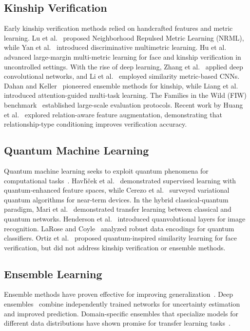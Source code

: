 \documentclass[journal,12pt]{IEEEtran}
\begin{document}
\subsection{Kinship Verification}
Early kinship verification methods relied on handcrafted features and
metric learning. Lu et al.~\cite{lu2014kinship} proposed Neighborhood
Repulsed Metric Learning (NRML), while Yan et al.~\cite{yan2014discriminative}
introduced discriminative multimetric learning. Hu et al.~\cite{hu2014large}
advanced large-margin multi-metric learning for face and kinship verification
in uncontrolled settings. With the rise of deep learning,
Zhang et al.~\cite{zhang2017kinship} applied deep convolutional networks,
and Li et al.~\cite{li2019kinship} employed similarity metric-based CNNs.
Dahan and Keller~\cite{dahan2017kin} pioneered ensemble methods for
kinship, while Liang et al.~\cite{liang2021attention} introduced
attention-guided multi-task learning. The Families in the Wild (FIW)
benchmark~\cite{robinson2018visual} established large-scale evaluation
protocols. Recent work by Huang et al.~\cite{huang2021relation} explored
relation-aware feature augmentation, demonstrating that relationship-type
conditioning improves verification accuracy.

\subsection{Quantum Machine Learning}
Quantum machine learning seeks to exploit quantum phenomena for
computational tasks~\cite{biamonte2017quantum,nielsen2010quantum}.
Havl\'{\i}\v{c}ek et al.~\cite{havlicek2019supervised} demonstrated
supervised learning with quantum-enhanced feature spaces, while
Cerezo et al.~\cite{cerezo2021variational} surveyed variational quantum
algorithms for near-term devices. In the hybrid classical-quantum paradigm,
Mari et al.~\cite{mari2020transfer} demonstrated transfer learning between
classical and quantum networks. Henderson et al.~\cite{henderson2020quanvolutional}
introduced quanvolutional layers for image recognition. LaRose and
Coyle~\cite{larose2020robust} analyzed robust data encodings for quantum
classifiers. Ortiz et al.~\cite{ortiz2020quantum} proposed quantum-inspired
similarity learning for face verification, but did not address kinship
verification or ensemble methods.

\subsection{Ensemble Learning}
Ensemble methods have proven effective for improving
generalization~\cite{zhou2012ensemble,lakshminarayanan2017simple}.
Deep ensembles~\cite{lakshminarayanan2017simple} combine independently
trained networks for uncertainty estimation and improved prediction.
Domain-specific ensembles that specialize models for different data
distributions have shown promise for transfer learning
tasks~\cite{shi2021domain,zhang2019bridging}.
\end{document}
